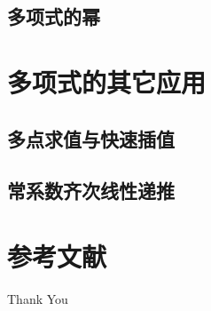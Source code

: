 \documentclass{beamer}
\begin{document}
\subsection{多项式的幂}

\section{多项式的其它应用}

\subsection{多点求值与快速插值}

\subsection{常系数齐次线性递推}

\section{参考文献}

\begin{frame}[allowframebreaks]
    
    
    \nocite{*} %
\end{frame}


\begin{frame}
    \begin{center}
        {\Huge\calligra Thank You}
    \end{center}
\end{frame}
\end{document}
